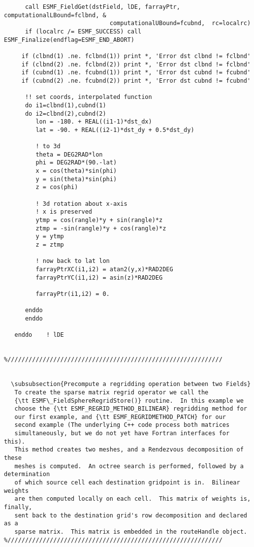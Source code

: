 \begin{verbatim}
      call ESMF_FieldGet(dstField, lDE, farrayPtr, computationalLBound=fclbnd, &
                              computationalUBound=fcubnd,  rc=localrc)
      if (localrc /= ESMF_SUCCESS) call ESMF_Finalize(endflag=ESMF_END_ABORT)
 
     if (clbnd(1) .ne. fclbnd(1)) print *, 'Error dst clbnd != fclbnd'
     if (clbnd(2) .ne. fclbnd(2)) print *, 'Error dst clbnd != fclbnd'
     if (cubnd(1) .ne. fcubnd(1)) print *, 'Error dst cubnd != fcubnd'
     if (cubnd(2) .ne. fcubnd(2)) print *, 'Error dst cubnd != fcubnd'
 
      !! set coords, interpolated function
      do i1=clbnd(1),cubnd(1)
      do i2=clbnd(2),cubnd(2)
         lon = -180. + REAL((i1-1)*dst_dx)
         lat = -90. + REAL((i2-1)*dst_dy + 0.5*dst_dy)
 
         ! to 3d
         theta = DEG2RAD*lon
         phi = DEG2RAD*(90.-lat)
         x = cos(theta)*sin(phi)
         y = sin(theta)*sin(phi)
         z = cos(phi)
 
         ! 3d rotation about x-axis
         ! x is preserved
         ytmp = cos(rangle)*y + sin(rangle)*z 
         ztmp = -sin(rangle)*y + cos(rangle)*z
         y = ytmp
         z = ztmp
 
         ! now back to lat lon
         farrayPtrXC(i1,i2) = atan2(y,x)*RAD2DEG
         farrayPtrYC(i1,i2) = asin(z)*RAD2DEG
 
         farrayPtr(i1,i2) = 0.
      
      enddo
      enddo
 
   enddo    ! lDE
 
  
%/////////////////////////////////////////////////////////////

  
  \subsubsection{Precompute a regridding operation between two Fields}
   To create the sparse matrix regrid operator we call the
   {\tt ESMF\_FieldSphereRegridStore()} routine.  In this example we
   choose the {\tt ESMF_REGRID_METHOD_BILINEAR} regridding method for
   our first example, and {\tt ESMF_REGRIDMETHOD_PATCH} for our
   second example (The underlying C++ code process both matrices
   simultaneously, but we do not yet have Fortran interfaces for this).
   This method creates two meshes, and a Rendezvous decomposition of these
   meshes is computed.  An octree search is performed, followed by a determination
   of which source cell each destination gridpoint is in.  Bilinear weights
   are then computed locally on each cell.  This matrix of weights is, finally,
   sent back to the destination grid's row decomposition and declared as a 
   sparse matrix.  This matrix is embedded in the routeHandle object. 
%/////////////////////////////////////////////////////////////


\end{verbatim}
